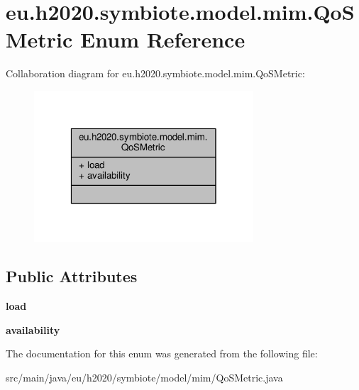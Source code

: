 \hypertarget{enumeu_1_1h2020_1_1symbiote_1_1model_1_1mim_1_1QoSMetric}{}\section{eu.\+h2020.\+symbiote.\+model.\+mim.\+Qo\+S\+Metric Enum Reference}
\label{enumeu_1_1h2020_1_1symbiote_1_1model_1_1mim_1_1QoSMetric}


Collaboration diagram for eu.\+h2020.\+symbiote.\+model.\+mim.\+Qo\+S\+Metric\+:\nopagebreak
\begin{figure}[H]
\begin{center}
\leavevmode
\includegraphics[width=232pt]{enumeu_1_1h2020_1_1symbiote_1_1model_1_1mim_1_1QoSMetric__coll__graph}
\end{center}
\end{figure}
\subsection*{Public Attributes}
\begin{DoxyCompactItemize}
\item 
\mbox{\label{enumeu_1_1h2020_1_1symbiote_1_1model_1_1mim_1_1QoSMetric_a289f03d941cf7170d89b492620f2fa9e}} 
{\bfseries load}
\item 
\mbox{\label{enumeu_1_1h2020_1_1symbiote_1_1model_1_1mim_1_1QoSMetric_ab21238884ab070496cf455cedf4bc606}} 
{\bfseries availability}
\end{DoxyCompactItemize}


The documentation for this enum was generated from the following file\+:\begin{DoxyCompactItemize}
\item 
src/main/java/eu/h2020/symbiote/model/mim/Qo\+S\+Metric.\+java\end{DoxyCompactItemize}
